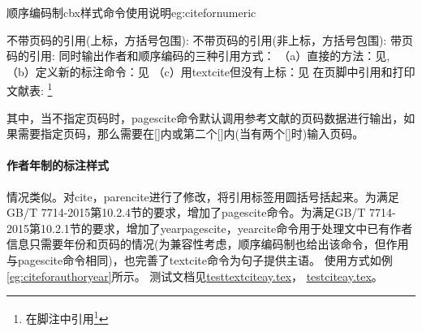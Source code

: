 \begin{example}{顺序编码制cbx样式命令使用说明}{eg:citefornumeric}
\begin{texlist}
不带页码的引用(上标，方括号包围):
    \cite{Peebles2001-100-100}
    \supercite{Peebles2001-100-100}
不带页码的引用(非上标，方括号包围):
    \parencite{Miroslav2004--}
带页码的引用:
    \cite[见][49页]{蔡敏2006--}  \parencite[见][49页]{Miroslav2004--}
同时输出作者和顺序编码的三种引用方式：
    （a）直接的方法：见\citeauthor{refb}\cite{refb}, \citeauthor{refc}\cite{refc}
    （b）定义新的标注命令：见
    （c）用textcite但没有上标：见\textcite{refb,refc}
在页脚中引用和打印文献表:
    \footnote{在脚注中引用\footcite{赵学功2001--}}  
    \end{texlist}
\end{example}

其中，当不指定页码时，pagescite命令默认调用参考文献的页码数据进行输出，如果需要指定页码，那么需要在[]内或第二个[]内(当有两个[]时)输入页码。


\paragraph{作者年制的标注样式} 情况类似。对cite，parencite进行了修改，将引用标签用圆括号括起来。为满足GB/T 7714-2015第10.2.4节的要求，增加了pagescite命令。为满足GB/T 7714-2015第10.2.1节的要求，增加了yearpagescite，yearcite命令用于处理文中已有作者信息只需要年份和页码的情况(为兼容性考虑，顺序编码制也给出该命令，但作用与pagescite命令相同)，也完善了textcite命令为句子提供主语。
使用方式如例\ref{eg:citeforauthoryear}所示。
测试文档见\href{run:example/testtextciteay.tex}{testtextciteay.tex}，
\href{run:example/testciteay.tex}{testciteay.tex}。


